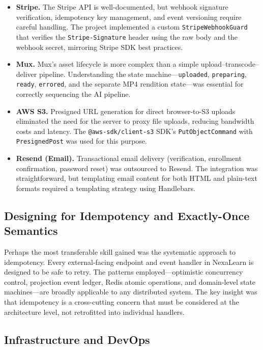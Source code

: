\begin{itemize}
  \item \textbf{Stripe.} The Stripe API is well-documented, but webhook signature verification, idempotency key management, and event versioning require careful handling. The project implemented a custom \texttt{StripeWebhookGuard} that verifies the \texttt{Stripe-Signature} header using the raw body and the webhook secret, mirroring Stripe SDK best practices.
  \item \textbf{Mux.} Mux's asset lifecycle is more complex than a simple upload--transcode--deliver pipeline. Understanding the state machine---\texttt{uploaded}, \texttt{preparing}, \texttt{ready}, \texttt{errored}, and the separate MP4 rendition state---was essential for correctly sequencing the AI pipeline.
  \item \textbf{AWS S3.} Presigned URL generation for direct browser-to-S3 uploads eliminated the need for the server to proxy file uploads, reducing bandwidth costs and latency. The \texttt{@aws-sdk/client-s3} SDK's \texttt{PutObjectCommand} with \texttt{PresignedPost} was used for this purpose.
  \item \textbf{Resend (Email).} Transactional email delivery (verification, enrollment confirmation, password reset) was outsourced to Resend. The integration was straightforward, but templating email content for both HTML and plain-text formats required a templating strategy using Handlebars.
\end{itemize}

\subsection{Designing for Idempotency and Exactly-Once Semantics}

Perhaps the most transferable skill gained was the systematic approach to idempotency. Every external-facing endpoint and event handler in NexaLearn is designed to be safe to retry. The patterns employed---optimistic concurrency control, projection event ledger, Redis atomic operations, and domain-level state machines---are broadly applicable to any distributed system. The key insight was that idempotency is a cross-cutting concern that must be considered at the architecture level, not retrofitted into individual handlers.

\subsection{Infrastructure and DevOps}

